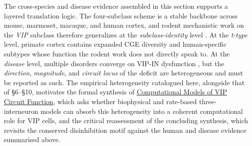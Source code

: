 \documentclass[11pt]{article}
\begin{document}
The cross-species and disease evidence assembled in this section supports
a layered translation logic. The four-subclass scheme is a stable
backbone across mouse, marmoset, macaque, and human cortex, and rodent
mechanistic work on the \textit{VIP} subclass therefore generalizes at the
\textit{subclass-identity} level
\citep{Tasic2018, Hodge2019, Bakken2021a, Braininitiativecellcensusnetworkbiccn2021, Lee2023a, Yao2023}.
At the \textit{t-type} level, primate cortex contains expanded CGE diversity
\citep{Bakken2021a, Bakken2021b} and human-specific subtypes
\citep{Boldog2018, Chartrand2023, Somogyi2025} whose function the rodent
work does not directly speak to. At the \textit{disease} level, multiple
disorders converge on VIP-IN dysfunction
\citep{Mossner2020, Chen2023b, Bhandari2024, Goff2023, Hanno2026, Michaud2024, Miller2025, Batistabrito2017, Kiss2026, Gil2024},
but the \textit{direction}, \textit{magnitude}, and \textit{circuit locus} of the deficit are
heterogeneous and must be reported as such. The empirical heterogeneity
catalogued here, alongside that of §6--§10, motivates the formal
synthesis of \href{/computational-models}{Computational Models of VIP Circuit Function}, which asks whether
biophysical and rate-based three-interneuron models can absorb this
heterogeneity into a coherent computational role for VIP cells, and the
critical reassessment of the concluding synthesis, which
revisits the conserved disinhibition motif \citep{Pi2013} against the human and disease
evidence summarised above.
\end{document}
